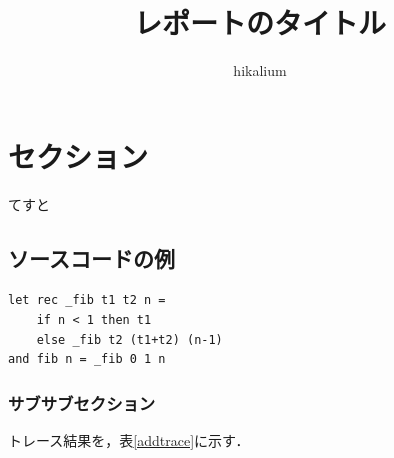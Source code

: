 


\title{レポートのタイトル}
\author{hikalium}
\maketitle
\thispagestyle{fancy}

\section{セクション}
てすと
\subsection{ソースコードの例}

\begin{lstlisting}[basicstyle=\ttfamily\footnotesize, frame=single]
let rec _fib t1 t2 n = 
    if n < 1 then t1
    else _fib t2 (t1+t2) (n-1)
and fib n = _fib 0 1 n
\end{lstlisting}

\subsubsection{サブサブセクション}
トレース結果を，表\ref{addtrace}に示す．

